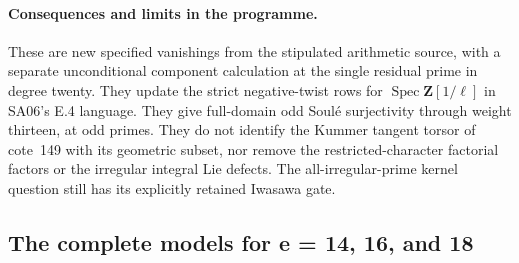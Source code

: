 \documentclass[11pt,a4paper]{article}
\theoremstyle{definition}
\begin{document}
\paragraph{Consequences and limits in the programme.}
These are new specified vanishings from the stipulated arithmetic
source, with a separate unconditional component calculation at the
single residual prime in degree twenty. They update the strict
negative-twist rows for $\operatorname{Spec}\mathbf Z[1/\ell]$ in
SA06's E.4 language. They give full-domain odd Soul\'e surjectivity
through weight thirteen, at odd primes. They do not identify the
Kummer tangent torsor of cote~149 with its geometric subset, nor
remove the restricted-character factorial factors or the irregular
integral Lie defects. The all-irregular-prime kernel question still
has its explicitly retained Iwasawa gate.

\subsection{The complete models for e = 14, 16, and 18}
\label{sec:u3-higher2}
\end{document}
